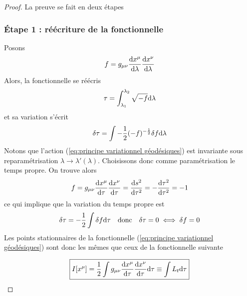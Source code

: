 \begin{proof} La preuve se fait en deux étapes
    \subsubsection{Étape 1 : réécriture de la fonctionnelle}
    Posons
    \begin{equation}
        f = g_{\mu \nu}\frac{\mathrm{d} x^{\mu}}{\mathrm{d} \lambda}\frac{\mathrm{d} x^{\nu}}{\mathrm{d} \lambda}
    \end{equation}
    Alors, la fonctionnelle se réécris
    \begin{equation}
        \tau =\int^{\lambda_2}_{\lambda_1}\sqrt{-f}\mathrm{d}\lambda
    \end{equation}
    et sa variation s'écrit
    \begin{equation}
        \delta \tau = \int -\frac{1}{2}(-f)^{-\frac{1}{2}}\delta f \mathrm{d} \lambda
    \end{equation}
    Notons que l'action (\ref{eq:principe variationnel géodésiques}) est invariante sous reparamétrisation $\lambda \rightarrow \lambda'(\lambda)$. Choisissons donc comme paramétrisation le temps propre. On trouve alors
    \begin{equation}
        f = g_{\mu \nu}\frac{\mathrm{d} x^{\mu}}{\mathrm{d} \tau}\frac{\mathrm{d} x^{\nu}}{\mathrm{d} \tau}= \frac{\mathrm{d} s^2}{\mathrm{d} \tau ^2}= -\frac{\mathrm{d} \tau^2}{\mathrm{d} \tau ^2} = -1
    \end{equation}
    ce qui implique que la variation du temps propre est 
    \begin{equation}
        \delta \tau = -\frac{1}{2}\int \delta f \mathrm{d}\tau \quad \text{donc} \quad \delta \tau = 0 \iff \delta f=0
    \end{equation}
    Les points stationnaires de la fonctionnelle (\ref{eq:principe variationnel géodésiques}) sont donc les mêmes que ceux de la fonctionnelle suivante 

    \begin{equation}
        \boxed{I[x^\mu] = \frac{1}{2}\int g_{\mu \nu} \frac{\mathrm{d} x^{\mu}}{\mathrm{d} \tau}\frac{\mathrm{d} x^{\nu}}{\mathrm{d} \tau} \mathrm{d} \tau \equiv \int L_t \mathrm{d} \tau}
        \label{eq:action I}
    \end{equation}

\end{proof}
